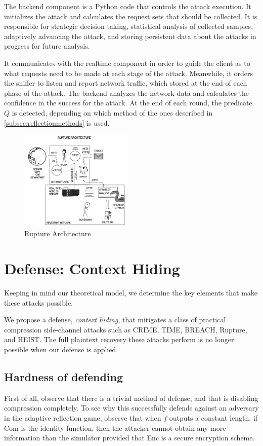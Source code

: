 \documentclass[conference, letterpaper, 10pt]{IEEEtran}
\begin{document}
The backend component is a Python code that controls the attack execution. It
initializes the attack and calculates the request sets that should be
collected. It is responsible for strategic decision taking, statistical
analysis of collected samples, adaptively advancing the attack, and storing
persistent data about the attacks in progress for future analysis.

It communicates with the realtime component in order to guide the client as to
what requests need to be made at each stage of the attack. Meanwhile, it orders
the sniffer to listen and report network traffic, which stored
at the end of each phase of the attack. The backend analyzes the
network data and calculates the confidence in the success for the attack. At the
end of each round, the predicate $Q$ is detected, depending on which method of
the ones described
in \ref{subsec:reflectionmethods} is used.

   \begin{figure}[thpb]
      \centering
          \includegraphics[width=0.48\textwidth]{architecture.png}
      \caption{Rupture Architecture}
   \end{figure}

\section{Defense: Context Hiding}\label{sec:defense}
Keeping in mind our theoretical model, we determine the key elements that make these
attacks possible.

We propose a defense, \textit{context hiding}, that mitigates a class of
practical compression side-channel attacks such as CRIME, TIME, BREACH, Rupture,
and HEIST. The full plaintext recovery these attacks perform is no longer
possible when our defense is applied.

\subsection{Hardness of defending}
First of all, observe that there is a trivial method of defense, and that is
disabling compression completely. To see why this successfully defends against
an adversary in the adaptive reflection game, observe that when $f$ outputs a
constant length, if Com is the identity function, then the attacker cannot
obtain any more information than the simulator provided that Enc is a secure
encryption scheme.
\end{document}
